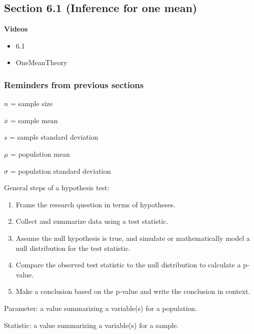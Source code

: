 \documentclass[
]{report}
\providecommand{\tightlist}{%
  \setlength{\itemsep}{0pt}\setlength{\parskip}{0pt}}
\begin{document}
\hypertarget{section-6.1-inference-for-one-mean}{%
\subsection*{Section 6.1 (Inference for one mean)}\label{section-6.1-inference-for-one-mean}}

\textbf{Videos}

\begin{itemize}
\tightlist
\item
  6.1
\item
  OneMeanTheory
\end{itemize}


\hypertarget{reminders-from-previous-sections-7}{%
\subsubsection*{Reminders from previous sections}\label{reminders-from-previous-sections-7}}

\(n\) = sample size

\(\overline{x}\) = sample mean

\(s\) = sample standard deviation

\(\mu\) = population mean

\(\sigma\) = population standard deviation

General steps of a hypothesis test:

\begin{enumerate}
\def\labelenumi{\arabic{enumi}.}
\item
  Frame the research question in terms of hypotheses.
\item
  Collect and summarize data using a test statistic.
\item
  Assume the null hypothesis is true, and simulate or mathematically model a null distribution for the test statistic.
\item
  Compare the observed test statistic to the null distribution to calculate a p-value.
\item
  Make a conclusion based on the p-value and write the conclusion in context.
\end{enumerate}

Parameter: a value summarizing a variable(s) for a population.

Statistic: a value summarizing a variable(s) for a sample.
\end{document}
